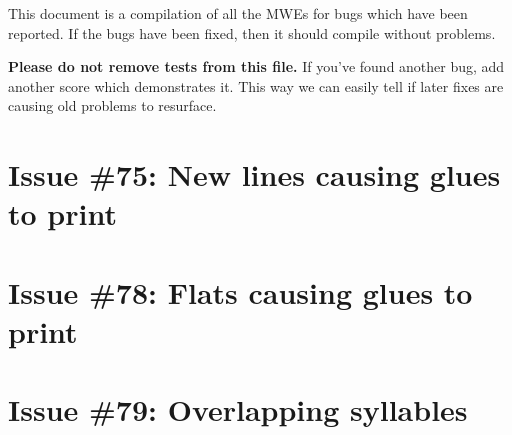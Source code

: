 \documentclass[11pt]{article}
\begin{document}
This document is a compilation of all the MWEs for bugs which have been reported.  If the bugs have been fixed, then it should compile without problems.

\textbf{Please do not remove tests from this file.}  If you've found another bug, add another score which demonstrates it.  This way we can easily tell if later fixes are causing old problems to resurface.


\section{Issue \#75: New lines causing glues to print}




\section{Issue \#78: Flats causing glues to print}

\section{Issue \#79: Overlapping syllables}
\end{document}
